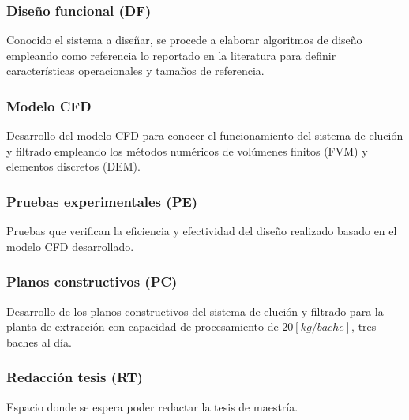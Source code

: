 \subsubsection{Dise\~no funcional (DF)}

\noindent
\justify

Conocido el sistema a dise\~nar, se procede a elaborar algoritmos de dise\~no empleando como referencia lo reportado en la literatura para definir caracter\'isticas operacionales y tama\~nos de referencia. 

\subsubsection{Modelo CFD}

\noindent
\justify

Desarrollo del modelo CFD para conocer el funcionamiento del sistema de eluci\'on y filtrado empleando los m\'etodos num\'ericos de vol\'umenes finitos (FVM) y elementos discretos (DEM).

\subsubsection{Pruebas experimentales (PE)}

\noindent
\justify

Pruebas que verifican la eficiencia y efectividad del dise\~no realizado basado en el modelo CFD desarrollado.

\subsubsection{Planos constructivos (PC)}

\noindent
\justify

Desarrollo de los planos constructivos del sistema de eluci\'on y filtrado para la planta de extracci\'on con capacidad de procesamiento de $20 \left[kg / bache \right]$, tres baches al d\'ia.

\subsubsection{Redacci\'on tesis (RT)}

\noindent
\justify

Espacio donde se espera poder redactar la tesis de maestr\'ia.
